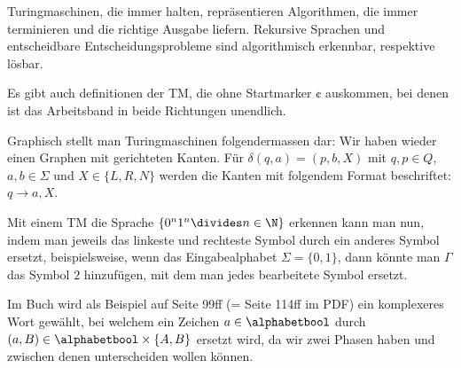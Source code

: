 Turingmaschinen, die immer halten, repräsentieren Algorithmen, die immer terminieren und die richtige Ausgabe liefern.
Rekursive Sprachen und entscheidbare Entscheidungsprobleme sind algorithmisch erkennbar, respektive lösbar.

Es gibt auch definitionen der TM, die ohne Startmarker $\cent$ auskommen, bei denen ist das Arbeitsband in beide Richtungen unendlich.

Graphisch stellt man Turingmaschinen folgendermassen dar:
Wir haben wieder einen Graphen mit gerichteten Kanten.
Für $\delta(q, a) = (p, b, X)$ mit $q, p \in Q$, $a, b \in \Sigma$ und $X \in \{ L, R, N \}$ werden die Kanten mit folgendem Format beschriftet:
$q \rightarrow a, X$.

Mit einem TM die Sprache $\{ 0^n 1^n \divides n \in \N \}$ erkennen kann man nun, indem man jeweils das linkeste und rechteste Symbol durch ein anderes Symbol ersetzt,
beispielsweise, wenn das Eingabealphabet $\Sigma = \{ 0, 1 \}$, dann könnte man $\Gamma$ das Symbol $2$ hinzufügen, mit dem man jedes bearbeitete Symbol ersetzt.

Im Buch wird als Beispiel auf Seite 99ff (= Seite 114ff im PDF) ein komplexeres Wort gewählt, 
bei welchem ein Zeichen $a \in \alphabetbool$ durch $(a, B) \in \alphabetbool \times \{ A, B \}$ ersetzt wird, 
da wir zwei Phasen haben und zwischen denen unterscheiden wollen können.

